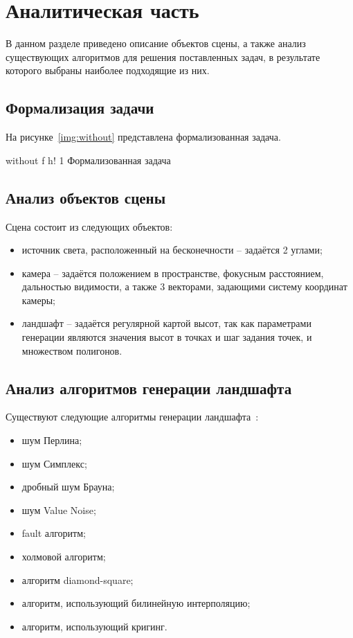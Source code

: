 \chapter{Аналитическая часть}

В данном разделе приведено описание объектов сцены, а также анализ существующих алгоритмов для решения поставленных задач, в результате которого выбраны наиболее подходящие из них.

\section{Формализация задачи}

На рисунке~\ref{img:without} представлена формализованная задача.

\FloatBarrier
{}
{without} %
{f} %
{h!} %
{1\textwidth} %
{Формализованная задача} %
\FloatBarrier

\section{Анализ объектов сцены}

Сцена состоит из следующих объектов:

\begin{itemize}
	\item источник света, расположенный на бесконечности -- задаётся 2 углами;
	\item камера -- задаётся положением в пространстве, фокусным расстоянием, дальностью видимости, а также 3 векторами, задающими систему координат камеры;
	\item ландшафт -- задаётся регулярной картой высот, так как параметрами генерации являются значения высот в точках и шаг задания точек, и множеством полигонов.
\end{itemize}

\section{Анализ алгоритмов генерации ландшафта}

Существуют следующие алгоритмы генерации ландшафта~\cite{landscapes}\cite{noises}\cite{nohabrinsource}\cite{usages}\cite{Voronezh}\cite{criging}:

\begin{itemize}
	\item шум Перлина;
	\item шум Симплекс;
	\item дробный шум Брауна;
	\item шум Value Noise;
	\item fault алгоритм;
	\item холмовой алгоритм;
	\item алгоритм diamond-square;
	\item алгоритм, использующий билинейную интерполяцию;
	\item алгоритм, использующий кригинг.
\end{itemize}

